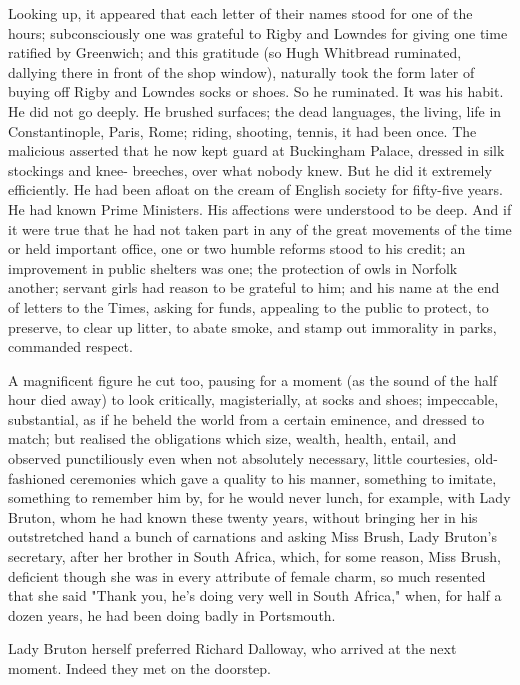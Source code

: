 \documentclass[lang=cn,10pt]{elegantbook}
\begin{document}
Looking up, it appeared that each letter of their names stood for
one of the hours; subconsciously one was grateful to Rigby and
Lowndes for giving one time ratified by Greenwich; and this
gratitude (so Hugh Whitbread ruminated, dallying there in front of
the shop window), naturally took the form later of buying off Rigby
and Lowndes socks or shoes.  So he ruminated.  It was his habit.
He did not go deeply.  He brushed surfaces; the dead languages, the
living, life in Constantinople, Paris, Rome; riding, shooting,
tennis, it had been once.  The malicious asserted that he now kept
guard at Buckingham Palace, dressed in silk stockings and knee-
breeches, over what nobody knew.  But he did it extremely
efficiently.  He had been afloat on the cream of English society
for fifty-five years.  He had known Prime Ministers.  His
affections were understood to be deep.  And if it were true that he
had not taken part in any of the great movements of the time or
held important office, one or two humble reforms stood to his
credit; an improvement in public shelters was one; the protection
of owls in Norfolk another; servant girls had reason to be grateful
to him; and his name at the end of letters to the Times, asking for
funds, appealing to the public to protect, to preserve, to clear up
litter, to abate smoke, and stamp out immorality in parks,
commanded respect.

A magnificent figure he cut too, pausing for a moment (as the sound
of the half hour died away) to look critically, magisterially, at
socks and shoes; impeccable, substantial, as if he beheld the world
from a certain eminence, and dressed to match; but realised the
obligations which size, wealth, health, entail, and observed
punctiliously even when not absolutely necessary, little
courtesies, old-fashioned ceremonies which gave a quality to his
manner, something to imitate, something to remember him by, for he
would never lunch, for example, with Lady Bruton, whom he had known
these twenty years, without bringing her in his outstretched hand a
bunch of carnations and asking Miss Brush, Lady Bruton's secretary,
after her brother in South Africa, which, for some reason, Miss
Brush, deficient though she was in every attribute of female charm,
so much resented that she said "Thank you, he's doing very well in
South Africa," when, for half a dozen years, he had been doing
badly in Portsmouth.

Lady Bruton herself preferred Richard Dalloway, who arrived at the
next moment.  Indeed they met on the doorstep.
\end{document}
